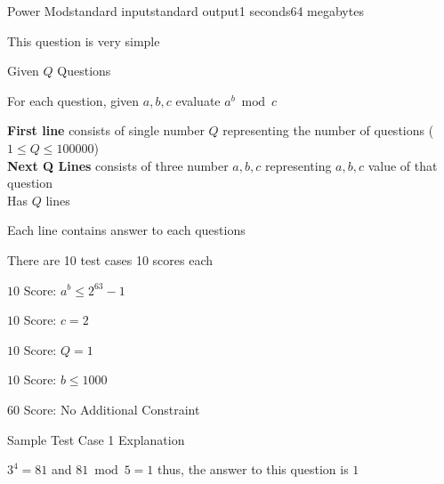 \documentclass[11pt,a4paper]{article}
\begin{document}
\begin{problem}{Power Mod}{standard input}{standard output}{1 seconds}{64 megabytes}

This question is very simple

Given $Q$ Questions

For each question, given $a, b, c$ evaluate $a^b\bmod c$

\InputFile

\textbf{First line} consists of single number $Q$ representing the number of questions ($1 \le Q \le 100000$) \\ 

\textbf{Next Q Lines} consists of three number $a,b,c$ representing $a,b,c$ value of that question \\

\OutputFile
Has $Q$ lines

Each line contains answer to each questions

\Scoring
There are 10 test cases 10 scores each

$10$ Score: $a^b \le 2^{63}-1$

$10$ Score: $c=2$

$10$ Score: $Q=1$

$10$ Score: $b \le 1000$

$60$ Score: No Additional Constraint

\Examples

\begin{example}
%
\end{example}

\Note

Sample Test Case 1 Explanation

$3^4 = 81$ and $81 \bmod 5 = 1$ thus, the answer to this question is $1$

\end{problem}
\end{document}
